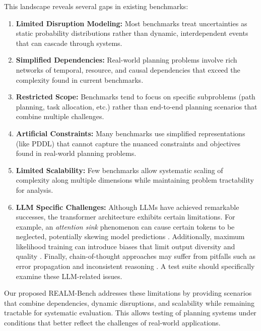 This landscape reveals several gaps in existing benchmarks: 

\begin{enumerate}[leftmargin=1.5em, topsep=0pt, parsep=0pt, label=\arabic*.]
\item \textbf{Limited Disruption Modeling:} Most benchmarks treat uncertainties as static probability distributions rather than dynamic, interdependent events that can cascade through systems. 
\item \textbf{Simplified Dependencies:} Real-world planning problems involve rich networks of temporal, resource, and causal dependencies that exceed the complexity found in current benchmarks. 
\item \textbf{Restricted Scope:} Benchmarks tend to focus on specific subproblems (path planning, task allocation, etc.) rather than end-to-end planning scenarios that combine multiple challenges. 
\item \textbf{Artificial Constraints:} Many benchmarks use simplified representations (like PDDL) that cannot capture the nuanced constraints and objectives found in real-world planning problems. 
\item \textbf{Limited Scalability:} Few benchmarks allow systematic scaling of complexity along multiple dimensions while maintaining problem tractability for analysis. 
\item \textbf{LLM Specific Challenges:} Although LLMs have achieved remarkable successes, the transformer architecture exhibits certain limitations. For example, an \textit{attention sink} phenomenon can cause certain tokens to be neglected, potentially skewing model predictions \cite{xiao2024attentionsink}. Additionally, maximum likelihood training can introduce biases that limit output diversity and quality \cite{holtzman2020curiouscaseneuraltext, SocraSynthChangCSCI2023}. Finally, chain-of-thought approaches may suffer from pitfalls such as error propagation and inconsistent reasoning \cite{brown2020language, prystawski2023why}. A test suite should specifically examine these LLM-related issues.
\end{enumerate}


Our proposed REALM-Bench addresses these limitations by providing scenarios that combine dependencies, dynamic disruptions, and scalability while remaining tractable for systematic evaluation. This allows testing of planning systems under conditions that better reflect the challenges of real-world applications.



